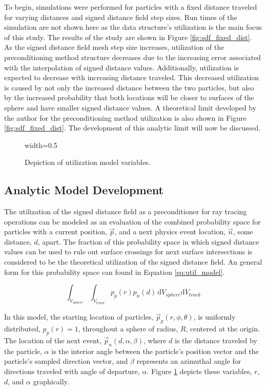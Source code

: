 To begin, simulations were performed for particles with a fixed distance
traveled for varying distances and signed distance field step sizes. Run times
of the simulation are not shown here as the data structure's utilization is the
main focus of this study. The results of the study are shown in
 Figure \ref{fig:sdf_fixed_dist}. As the signed distance field mesh step size
increases, utilization of the preconditioning method structure decreases due to the increasing
error associated with the interpolation of signed distance values. Additionally,
utilization is expected to decrease with increasing distance traveled. This
decreased utilization is caused by not only the increased distance between the
two particles, but also by the increased probability that both locations will be
closer to surfaces of the sphere and have smaller signed distance values. A
theoretical limit developed by the author for the preconditioning method
utilization is also shown in Figure \ref{fig:sdf_fixed_dist}. The development of
this analytic limit will now be discussed.

\begin{figure}[ht]
  \centering
  {width=0.5\textwidth}
  \caption[Depiction of utilization model variables.]{Depiction of utilization
    model variables.}
  \label{fig:model}
\end{figure}

\subsection{Analytic Model Development}
  
The utilization of the signed distance field as a preconditioner for ray tracing
operations can be modeled as an evaluation of the combined probability space for
particles with a current position, $\vec{p}$, and a next physics event location,
$\vec{n}$, some distance, $d$, apart. The fraction of this probability
space in which signed distance values can be used to rule out surface crossings
for next surface intersections is considered to be the theoretical
utilization of the signed distance field. An general form for this probability
space can found in Equation \eqref{eq:util_model}.

\begin{equation}
  \label{eq:util_model}
\int_{V_{sphere}}\int_{V_{track}} p_p(r) p_n(d) \, \mathrm{d}V_{sphere}\mathrm{d}V_{track}
\end{equation}

In this model, the starting location of particles, $\vec{p}_{p}(r,\phi,\theta)$, is
uniformly distributed, $p_p(r)=1$, throughout a sphere of radius, $R$, centered
at the origin.  The location of the next event, $\vec{p}_{n}(d,\alpha,\beta)$, where $d$
is the distance traveled by the particle, $\alpha$ is the interior angle between
the particle's position vector and the particle's sampled direction
vector, and $\beta$ represents an azimuthal angle for directions traveled with
angle of departure, $\alpha$. Figure \ref{fig:model} depicts these variables, $r$,
$d$, and $\alpha$ graphically.


